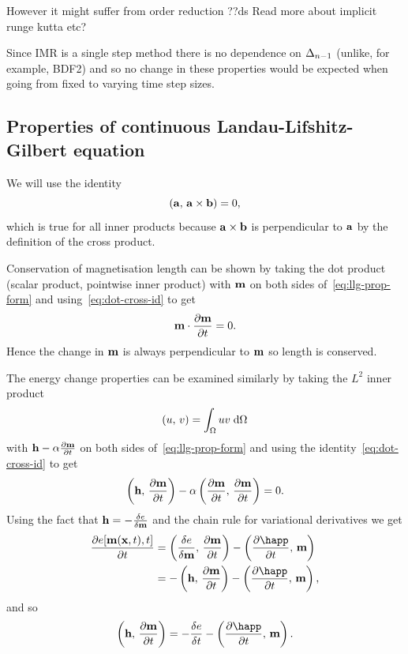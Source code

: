 However it might suffer from order reduction ??ds Read more about implicit runge kutta etc?

Since IMR is a single step method there is no dependence on $\Delta_{n-1}$ (unlike, for example, BDF2) and so no change in these properties would be expected when going from fixed to varying time step sizes.

\subsection{Properties of continuous Landau-Lifshitz-Gilbert equation}
\label{sec:prop-cont-llg}

We will use the identity
\begin{equation}
  \label{eq:dot-cross-id}
  \left({\mathbf{a}},\, {\mathbf{a}} \times {\mathbf{b}} \right) = 0,
\end{equation}
which is true for all inner products because ${\mathbf{a}} \times {\mathbf{b}}$ is perpendicular to ${\mathbf{a}}$ by the definition of the cross product.

Conservation of magnetisation length can be shown by taking the dot product (scalar product, pointwise inner product) with $\mathbf{m}$ on both sides of~\eqref{eq:llg-prop-form} and using~\eqref{eq:dot-cross-id} to get
\begin{equation}
  \label{eq:56}
  \mathbf{m} \cdot \frac{\partial \mathbf{m}}{\partial t} = 0.
\end{equation}
Hence the change in $\mathbf{m}$ is always perpendicular to $\mathbf{m}$ so length is conserved.

The energy change properties can be examined similarly by taking the $L^2$ inner product
\begin{equation}
  \left(u,\, v \right) = \int_\Omega u v {\; \text{d}}\Omega
\end{equation}
with $\mathbf{h} - \alpha \frac{\partial \mathbf{m}}{\partial t}$ on both sides of~\eqref{eq:llg-prop-form} and using the identity~\eqref{eq:dot-cross-id} to get
\begin{equation}
  \label{eq:58}
  \left(\mathbf{h},\, \frac{\partial \mathbf{m}}{\partial t} \right) - \alpha \left(\frac{\partial \mathbf{m}}{\partial t},\, \frac{\partial \mathbf{m}}{\partial t} \right) = 0.
\end{equation}
Using the fact that $\mathbf{h} = -\frac{\delta e}{\delta \mathbf{m}}$ and the chain rule for variational derivatives\cite{??ds} we get
\begin{align*}
  \pd{\e[\mv(\xv, t), t]}{t} &= \ip{\vd{e}{\mv}}{\dmdt} - \ip{\pd{\happ}{t}}{\mv} \\
             &= -\ip{\hv}{\dmdt} - \ip{\pd{\happ}{t}}{\mv},
\end{align*}
and so
\begin{equation}
  \ip{\hv}{\dmdt} = -\vd{\e}{t} - \ip{\pd{\happ}{t}}{\mv}.
\end{equation}


